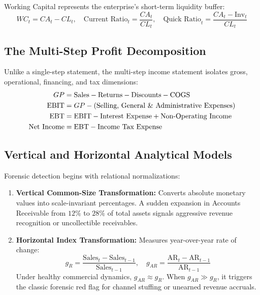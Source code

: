 Working Capital represents the enterprise's short-term liquidity buffer:
\begin{equation}
WC_t = CA_t - CL_t, \quad \text{Current Ratio}_t = \frac{CA_t}{CL_t}, \quad \text{Quick Ratio}_t = \frac{CA_t - \text{Inv}_t}{CL_t}
\end{equation}

\subsection{The Multi-Step Profit Decomposition}
Unlike a single-step statement, the multi-step income statement isolates gross, operational, financing, and tax dimensions:
\begin{align}
GP &= \text{Sales} - \text{Returns} - \text{Discounts} - \text{COGS} \\
\text{EBIT} &= GP - (\text{Selling, General \& Administrative Expenses}) \\
\text{EBT} &= \text{EBIT} - \text{Interest Expense} + \text{Non-Operating Income} \\
\text{Net Income} &= \text{EBT} - \text{Income Tax Expense}
\end{align}

\subsection{Vertical and Horizontal Analytical Models}
Forensic detection begins with relational normalizations:
\begin{enumerate}
    \item \textbf{Vertical Common-Size Transformation:} Converts absolute monetary values into scale-invariant percentages. A sudden expansion in Accounts Receivable from $12\%$ to $28\%$ of total assets signals aggressive revenue recognition or uncollectible receivables.
    \item \textbf{Horizontal Index Transformation:} Measures year-over-year rate of change:
    \begin{equation}
    g_{R} = \frac{\text{Sales}_t - \text{Sales}_{t-1}}{\text{Sales}_{t-1}}, \quad g_{AR} = \frac{\text{AR}_t - \text{AR}_{t-1}}{\text{AR}_{t-1}}
    \end{equation}
    Under healthy commercial dynamics, $g_{AR} \approx g_{R}$. When $g_{AR} \gg g_R$, it triggers the classic forensic red flag for channel stuffing or unearned revenue accruals.
\end{enumerate}

